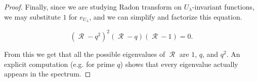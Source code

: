 \documentclass[10pt,a4paper]{amsart}
\DeclareMathOperator{\R}{\mathcal{R}}
\begin{document}
\begin{proof}
Finally, since we are studying Radon transform on $U_\lambda$-invariant functions, we may substitute $1$ for $e_{U_{\lambda}}$, and we can simplify and factorize this equation.

\begin{equation*}
    (\R - q^2)^2(\R - q)(\R -1) = 0.
\end{equation*}
 
From this we get that all the possible eigenvalues of $\R$ are $1$, $q$, and $q^2$. An explicit computation (e.g. for prime $q$) shows that every eigenvalue actually appears in the spectrum.
\end{proof}
\end{document}
